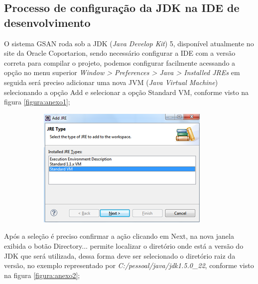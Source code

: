 \begin{apendicesenv}
	
	\partapendices

\chapter{Processo de configuração da JDK na IDE de desenvolvimento}

O sistema GSAN roda sob a JDK (\textit{Java Develop Kit}) 5, disponível atualmente no site da Oracle Coportarion, sendo necessário configurar a IDE com a versão correta para compilar o projeto, podemos configurar facilmente acessando a opção no menu superior \textit{Window > Preferences > Java > Installed JREs} em seguida será preciso adicionar uma nova JVM (\textit{Java Virtual Machine}) selecionando a opção Add e selecionar a opção Standard VM, conforme visto na figura \ref{figura:anexo1};

\begin{figure}[H]
	\centering
	\caption*{Selecionar Tipo de JVM.}
	\label{figura:anexo1}
	\begin{subfigure}[H]{\textwidth}
		\centering
		\includegraphics{figuras/anexo/selectJVM.png}
	\end{subfigure}
\end{figure}


Após a seleção é preciso confirmar a ação clicando em Next, na nova janela exibida o botão Directory... permite localizar o diretório onde está a versão do JDK que será utilizada, dessa forma deve ser selecionado o diretório raiz da versão, no exemplo representado por \textit{C:/pessoal/java/jdk1.5.0\_22}, conforme visto na figura \ref{figura:anexo2};


\end{apendicesenv}

